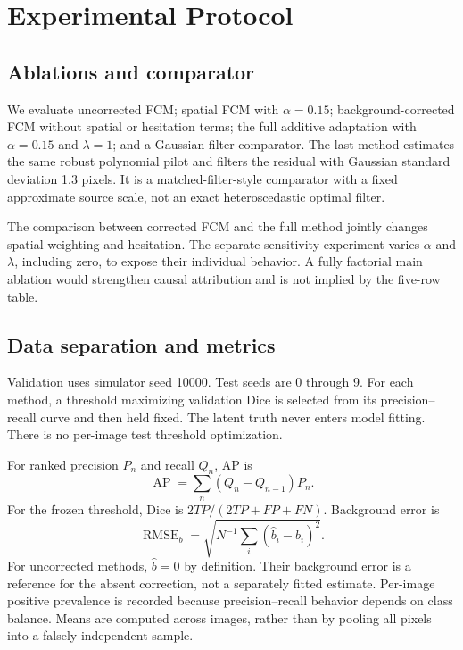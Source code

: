 \documentclass[conference]{IEEEtran}
\begin{document}
\section{Experimental Protocol}
\subsection{Ablations and comparator}
We evaluate uncorrected FCM; spatial FCM with $\alpha=0.15$; background-corrected FCM without spatial or hesitation terms; the full additive adaptation with $\alpha=0.15$ and $\lambda=1$; and a Gaussian-filter comparator. The last method estimates the same robust polynomial pilot and filters the residual with Gaussian standard deviation 1.3 pixels. It is a matched-filter-style comparator with a fixed approximate source scale, not an exact heteroscedastic optimal filter.

The comparison between corrected FCM and the full method jointly changes spatial weighting and hesitation. The separate sensitivity experiment varies $\alpha$ and $\lambda$, including zero, to expose their individual behavior. A fully factorial main ablation would strengthen causal attribution and is not implied by the five-row table.

\subsection{Data separation and metrics}
Validation uses simulator seed 10000. Test seeds are 0 through 9. For each method, a threshold maximizing validation Dice is selected from its precision--recall curve and then held fixed. The latent truth never enters model fitting. There is no per-image test threshold optimization.

For ranked precision $P_n$ and recall $Q_n$, AP is
\begin{equation}
 \operatorname{AP}=\sum_n(Q_n-Q_{n-1})P_n.
\end{equation}
For the frozen threshold, Dice is $2TP/(2TP+FP+FN)$. Background error is
\begin{equation}
 \operatorname{RMSE}_b=\sqrt{N^{-1}\sum_i(\widehat b_i-b_i)^2}.
\end{equation}
For uncorrected methods, $\widehat b=0$ by definition. Their background error is a reference for the absent correction, not a separately fitted estimate. Per-image positive prevalence is recorded because precision--recall behavior depends on class balance. Means are computed across images, rather than by pooling all pixels into a falsely independent sample.
\end{document}
